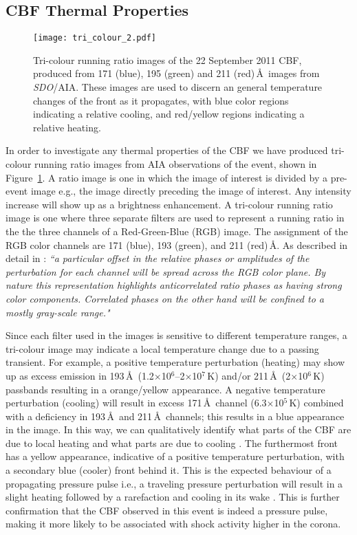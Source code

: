 \subsection{CBF Thermal Properties}
\begin{figure}[h!]
\begin{center}
\texttt{[image: tri\_colour\_2.pdf]}
\caption[Tri-colour running ratio images of a CBF.]{Tri-colour running ratio images of the 22 September 2011 CBF, produced from 171 (blue), 195 (green) and 211 (red)\,\AA~images from \emph{SDO}/AIA. These images are used to discern an general temperature changes of the front as it propagates, with blue color regions indicating a relative cooling, and red/yellow regions indicating a relative heating.}
\label{fig:tri_color}
\end{center}
\end{figure}
In order to investigate any thermal properties of the CBF we have produced tri-colour running ratio images from AIA observations of the event, shown in Figure~\ref{fig:tri_color}. A ratio image is one in which the image of interest is divided by a pre-event image e.g., the image directly preceding the image of interest. Any intensity increase will show up as a brightness enhancement. A tri-colour running ratio image is one where three separate filters are used to represent a running ratio in the the three channels of a Red-Green-Blue (RGB) image. The assignment of the RGB color channels are 171 (blue), 193 (green), and 211 (red)\,\AA. As described in detail in \citet{downs2012}: {\it ``a particular offset in the relative phases or amplitudes of the perturbation for each channel will be spread across the RGB color plane. By nature this representation highlights anticorrelated ratio phases as having strong color components. Correlated phases on the other hand will be confined to a mostly gray-scale range."} 

Since each filter used in the images is sensitive to different temperature ranges, a tri-colour image may indicate a local temperature change due to a passing transient. For example, a positive temperature perturbation (heating) may show up as excess emission in 193\,\AA~(1.2$\times$10$^6$--2$\times$10$^7$\,K) and/or 211\,\AA~(2$\times$10$^6$\,K) passbands resulting in a orange/yellow appearance. A negative temperature perturbation (cooling) will result in excess 171\,\AA~channel (6.3$\times$10$^5$\,K) combined with a deficiency in 193\,\AA~and 211\,\AA~channels; this results in a blue appearance in the image. In this way, we can qualitatively identify what parts of the CBF are due to local heating and what parts are due to cooling \citep{cohen2009, downs2012, cheng2012}. The furthermost front has a yellow appearance, indicative of a positive temperature perturbation, with a secondary blue (cooler) front behind it. This is the expected behaviour of a propagating pressure pulse i.e., a traveling pressure perturbation will result in a slight heating followed by a rarefaction and cooling in its wake \citet{downs2012}. This is further confirmation that the CBF observed in this event is indeed a pressure pulse, making it more likely to be associated with shock activity higher in the corona.

